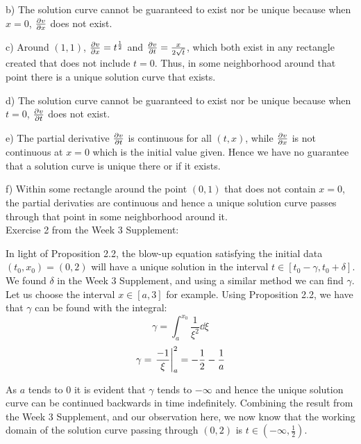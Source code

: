 \documentclass[11pt]{article}
\newcommand{\br}[1]{\left(#1\right)}
\newcommand{\sbr}[1]{\left[#1\right]}
\begin{document}
b) The solution curve cannot be guaranteed to exist nor be unique because when $x=0$, $\pdv{v}{x}$ does not exist.

c) Around $(1,1)$, $\pdv{v}{x} = t^{\frac{1}{2}}$ and $\pdv{v}{t} = \frac{x}{2\sqrt{t}}$, which both exist in any rectangle created that does not include $t=0$. Thus, in some neighborhood around that point there is a unique solution curve that exists.

d) The solution curve cannot be guaranteed to exist nor be unique because when $t=0$, $\pdv{v}{t}$ does not exist.

e) The partial derivative $\pdv{v}{t}$ is continuous for all $(t,x)$, while $\pdv{v}{x}$ is not continuous at $x=0$ which is the initial value given. Hence we have no guarantee that a solution curve is unique there or if it exists.

f) Within some rectangle around the point $(0,1)$ that does not contain $x=0$, the partial derivaties are continuous and hence a unique solution curve passes through that point in some neighborhood around it. \\

Exercise 2 from the Week 3 Supplement: 

In light of Proposition 2.2, the blow-up equation satisfying the initial data $(t_0,x_0) = (0,2)$ will have a unique solution in the interval $t\in \sbr{t_0-\gamma, t_0+\delta}$. We found $\delta$ in the Week 3 Supplement, and using a similar method we can find $\gamma$. Let us choose the interval $x\in\sbr{a,3}$ for example. Using Proposition 2.2, we have that $\gamma$ can be found with the integral:
$$\gamma = \int_a^{x_0} \frac{1}{\xi^2}\dd{\xi}$$
$$\gamma = \eval{\frac{-1}{\xi}}_a^2 = -\frac{1}{2} - \frac{1}{a}$$

As $a$ tends to $0$ it is evident that $\gamma$ tends to $-\infty$ and hence the unique solution curve can be continued backwards in time indefinitely. Combining the result from the Week 3 Supplement, and our observation here, we now know that the working domain of the solution curve passing through $(0,2)$ is $t\in\br{-\infty,\frac{1}{2}}$.
\end{document}
